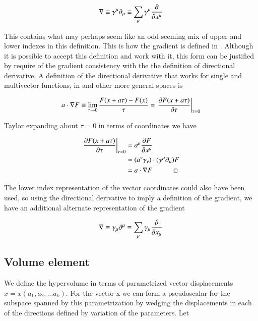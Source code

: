 \begin{align}
\grad \equiv \gamma^\mu \partial_\mu \equiv \sum_\mu \gamma^\mu \PD{x^\mu}{}
\end{align}

This contains what may perhaps seem like an odd seeming mix of upper and lower indexes in this definition.  This is how the gradient is defined in \cite{doran2003gap}.  Although it is possible to accept this definition and work with it, this form can be justified by require of the gradient consistency with the the definition of directional derivative.  A definition of the directional derivative that works for single and multivector functions, in  and other more general spaces is

\begin{align}
a \cdot \grad F \equiv \lim_{\tau \rightarrow 0} \frac{F(x + a\tau) - F(x)}{\tau} = {\left.\PD{\tau}{F(x + a\tau)} \right\vert}_{\tau=0}
\end{align}

Taylor expanding about $\tau=0$ in terms of coordinates we have

\begin{align*}
{\left.\PD{\tau}{F(x + a\tau)} \right\vert}_{\tau=0}
&= a^\mu \PD{x^\mu}{F} \\
&= (a^\nu \gamma_\nu) \cdot (\gamma^\mu \partial_\mu) F \\
&= a \cdot \grad F \quad\quad\quad\square
\end{align*}

The lower index representation of the vector coordinates could also have been used, so using the directional derivative to imply a definition of the gradient, we have an additional alternate representation of the gradient

\begin{align}
\grad \equiv \gamma_\mu \partial^\mu \equiv \sum_\mu \gamma_\mu \PD{x_\mu}{}
\end{align}

\subsection{Volume element}
We define the hypervolume in terms of parametrized vector displacements $x = x(a_1, a_2, ... a_k)$.  For the vector x we can form a pseudoscalar for the subspace spanned by this parametrization by wedging the displacements in each of the directions defined by variation of the parameters.  Let

